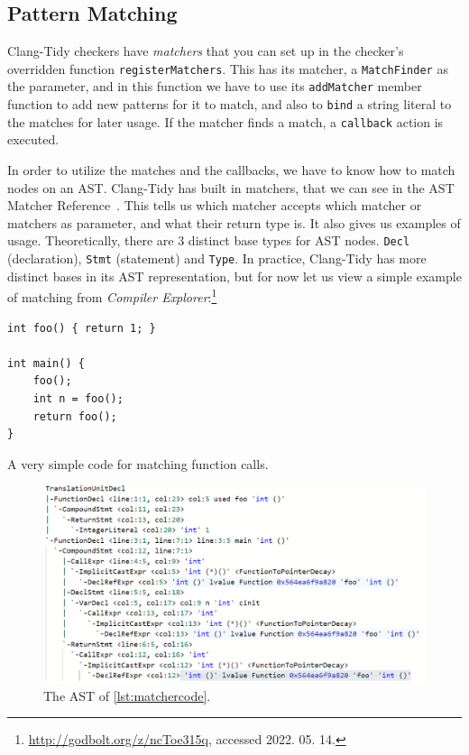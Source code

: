 \subsection{Pattern Matching}

Clang-Tidy checkers have \emph{matchers} that you can set up in the checker's overridden function \texttt{registerMatchers}.
This has its matcher, a \texttt{MatchFinder} as the parameter, and in this function we have to use its \texttt{addMatcher}
member function to add new patterns for it to match, and also to \texttt{bind} a string literal to the matches for later usage.
If the matcher finds a match, a \texttt{callback} action is executed.

In order to utilize the matches and the callbacks, we have to know how to match nodes on an AST. Clang-Tidy has built in matchers,
that we can see in the AST Matcher Reference~\cite{matcherref}. This tells us which matcher accepts which matcher or matchers as
parameter, and what their return type is. It also gives us examples of usage.
Theoretically, there are 3 distinct base types for AST nodes. \texttt{Decl} (declaration), \texttt{Stmt} (statement) and \texttt{Type}. In practice,
Clang-Tidy has more distinct bases in its AST representation, but for now let us view a simple example of matching from
\emph{Compiler Explorer}:\footnote{\url{http://godbolt.org/z/ncToe315q}, accessed 2022. 05. 14.}

\begin{listing}[H]
  \begin{verbatim}
int foo() { return 1; }

int main() {
	foo();
	int n = foo();
	return foo();
}
  \end{verbatim}
  \caption{A very simple code for matching function calls.}\label{lst:matchercode}
\end{listing}

\begin{figure}[H]
    \includegraphics[width=\linewidth]{images/ast_for_matching.png}
	\caption{The AST of \cref{lst:matchercode}.}
    \label{fig:ast3}
\end{figure}

